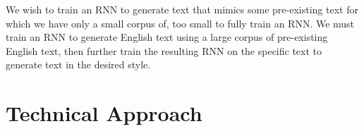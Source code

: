 \documentclass[10pt,twocolumn,letterpaper]{article}
\begin{document}
	We wish to train an RNN to generate text that  mimics some pre-existing text for which we have only a small corpus of, too small to fully train an RNN. We must train an RNN to generate English text using a large corpus of pre-existing English text, then further train the resulting RNN on the specific text to generate text in the desired style.
	
\section{Technical Approach}
\end{document}
